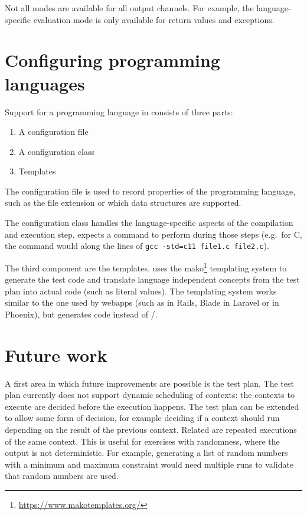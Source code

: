 \documentclass[5p,number]{elsarticle}
\begin{document}
    Not all modes are available for all output channels.
    For example, the language-specific evaluation mode is only available for return values and exceptions.

    \section{Configuring programming languages}\label{sec:configuring-programming-languages}

    Support for a programming language in \tested{} consists of three parts:

    \begin{enumerate}
        \item A configuration file
        \item A configuration class
        \item Templates
    \end{enumerate}

    The configuration file is used to record properties of the programming language, such as the file extension or which data structures are supported.

    The configuration class handles the language-specific aspects of the compilation and execution step.
    \tested{} expects a command to perform during those steps (e.g.\ for C, the command would along the lines of \texttt{gcc -std=c11 file1.c file2.c}).

    The third component are the templates.
    \tested{} uses the mako\footnote{\url{https://www.makotemplates.org/}} templating system to generate the test code and translate language independent concepts from the test plan into actual code (such as literal values).
    The templating system works similar to the one used by webapps (such as  in Rails, Blade in Laravel or  in Phoenix), but generates code instead of /.
    
    \section{Future work}\label{sec:future-work}
    
    A first area in which future improvements are possible is the test plan.
    The test plan currently does not support dynamic scheduling of contexts: the contexts to execute are decided before the execution happens.
    The test plan can be extended to allow some form of decision, for example deciding if a context should run depending on the result of the previous context.
    Related are repeated executions of the same context.
    This is useful for exercises with randomness, where the output is not deterministic.
    For example, generating a list of random numbers with a minimum and maximum constraint would need multiple runs to validate that random numbers are used.
    
\end{document}

